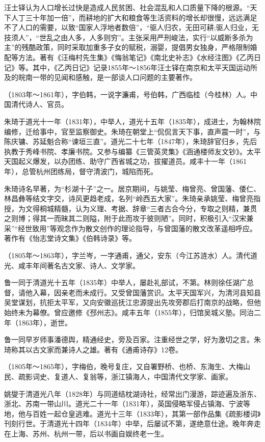 \begin{description}
        汪士铎认为人口增长过快是造成人民贫困、社会混乱和人口质量下降的根源。“天下人丁三十年加一倍”，而耕地的扩大和粮食等生活资料的增长却很慢，远远满足不了人口的需要，以致“国家人浮地者数倍”，“驱人归农，无田可耕;驱人归业，无技须人”，“世乱之由人多，人多则穷”。主张采用严刑峻法，实行“以威断多杀为主”的残酷政策，同时采取加重多子女的赋税，溺婴，提倡男女独身，严格限制婚配等方法。著有《汪梅村先生集》《悔翁笔记》《南北史补志》《水经注图》《乙丙日记》等。其中，《乙丙日记》记录1855年～1856年汪士铎在南京和太平天国运动所及的皖南一带的见闻和感触，是一部谈人口问题的主要著作。
  \item[朱琦] （1803年～1861年），字伯韩，一说字濂甫，号伯韩，广西临桂（今桂林）人。中国清代诗人、官员。\par
        朱琦于道光十一年（1831年），中举人，道光十五年（1835年），成进士，为翰林院编修，迁给事中，官至监察御史。朱琦在朝堂上“侃侃言天下事，直声震一时”，与陈庆镛、苏延魁合称“谏垣三直”。道光二十七年（1847年），朱琦辞官归乡，先后执教于秀峰书院、孝廉书院。又参与编纂《三管英灵集》《涵通楼师友文钞》。太平天国起义爆发，以办团练、助守广西省城之功，拔擢道员。咸丰十一年（1861年），总管杭州团练局，督守清波门，城陷而死。\par
        朱琦诗名早著，为“杉湖十子”之一。居京期间，与姚莹、梅曾亮、曾国藩、倭仁、林昌彝等结文字交，诗风更趋老成，名列“岭西五大家”。朱琦亲承姚莹、梅曾亮指授，为文得桐城精髓，认为义理、考据、辞章“三者古合今分，专取之则精，兼贯之则博；得其一而昧其二则隘，附于此而攻于彼则陋”。同时，积极引入“汉宋兼采”“经世致用”等观念作为散文创作的理论指导，与曾国藩的散文改革遥相呼应。著作有《怡志堂诗文集》《伯韩诗录》等。
  \item[鲁一同] （1805年～1863年），字兰岑，一字通甫，通父，安东（今江苏涟水）人。清代道光、咸丰年间著名古文家、诗人、文学家。\par
        鲁一同于清道光十五年（1835年）中举人，屡赴礼部试，不第。林则徐任湖广总督，请他入幕，因亲老而未成行。又受曾国藩赏识。太平天国军兴，为清河县知县吴堂谋划，抗拒太平军，又向安徽巡抚江忠源提出先攻旁郡后打南京的战略，但他始终未为幕僚。曾应邀修《邳州志》。咸丰五年（1855年），归馆吴城义塾。同治二年（1863年），逝世。\par
        鲁一同早岁师事潘德舆，精通经史，旁及百家。注重经世之学，好为激切之言。朱琦称其以古文家而兼诗人之雄。著有《通甫诗存》12卷。
  \item[姚燮] （1805年～1865年），字梅伯，晚号复庄，又自署野桥、也桥、东海生、大梅山民、疏影词史、复道人、复翁等，浙江镇海人，中国清代文学家、画家。\par
        姚燮于清道光八年（1828年）与同道结枕湖诗社，经常出门漫游，踪迹遍及浙东、浙北、苏南一带山川。道光二十一年（1831年），英国侵略军侵占镇海、宁波等地，他与百姓一起仓皇逃难。道光十三年（1833年），其第一部作品集《疏影楼词》刊刻行世。于清道光十四年（1834年）中举，后屡试不第，遂绝意仕途。晚年奔走在上海、苏州、杭州一带，后以书画自娱终老一生。\par

\end{description}
